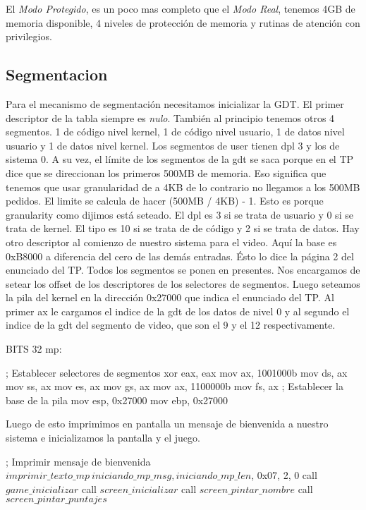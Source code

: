 El \textit{Modo Protegido}, es un poco mas completo que el \textit{Modo Real}, tenemos 4GB de memoria disponible, 4 niveles de protecci\'on de memoria y rutinas de atenci\'on con privilegios.

\subsection{Segmentacion}
Para el mecanismo de segmentación necesitamos inicializar la GDT.
El primer descriptor de la tabla siempre es \textit{nulo}. También al principio tenemos otros 4 segmentos. 1 de código nivel kernel, 1 de código nivel usuario, 1 de datos nivel usuario y 1 de datos nivel kernel. Los segmentos de user tienen dpl 3 y los de sistema 0. A su vez, el límite de los segmentos de la gdt se saca porque en el TP dice que se direccionan los primeros 500MB de memoria. Eso significa que tenemos que usar granularidad de a 4KB de lo contrario no llegamos a los 500MB pedidos. El limite se calcula de hacer (500MB / 4KB) - 1. Esto es porque granularity como dijimos está seteado. El dpl es 3 si se trata de usuario y 0 si se trata de kernel. El tipo es 10 si se trata de  de código y 2 si se trata de datos. Hay otro descriptor al comienzo de nuestro sistema para el video. Aquí la base es 0xB8000 a diferencia del cero de las demás entradas. Ésto lo dice la página 2 del enunciado del TP. Todos los segmentos se ponen en presentes.
\newline
Nos encargamos de setear los offset de los descriptores de los selectores de segmentos. Luego seteamos la pila del kernel en la direcci\'on 0x27000 que indica el enunciado del TP. Al primer ax le cargamos el indice de la gdt de los datos de nivel 0 y al segundo el indice de la gdt del segmento de video, que son el 9 y el 12 respectivamente.

\begin{algorithmic}
\State \tab BITS 32
\State \tab mp:

    \State \tab \tab ; Establecer selectores de segmentos
    \State \tab \tab xor eax, eax
    \State \tab \tab  mov ax, 1001000b
    \State \tab \tab  mov ds, ax
    \State \tab \tab  mov ss, ax
    \State \tab \tab  mov es, ax
    \State \tab \tab  mov gs, ax
    \State \tab \tab  mov ax, 1100000b
    \State \tab \tab  mov fs, ax
    \State \tab \tab  ; Establecer la base de la pila
    \State \tab \tab  mov esp, 0x27000
    \State \tab \tab  mov ebp, 0x27000
\end{algorithmic}

Luego de esto imprimimos en pantalla un mensaje de bienvenida a nuestro sistema e inicializamos la pantalla y el juego.
\begin{algorithmic}
    \State \tab \tab ; Imprimir mensaje de bienvenida
    \State \tab \tab $imprimir\_texto\_mp \ iniciando\_mp\_msg, iniciando\_mp\_len$, 0x07, 2, 0
    \State \tab \tab call $game\_inicializar$
    \State \tab \tab call $screen\_inicializar$
    \State \tab \tab call $screen\_pintar\_nombre$
    \State \tab \tab call $screen\_pintar\_puntajes$
\end{algorithmic}

